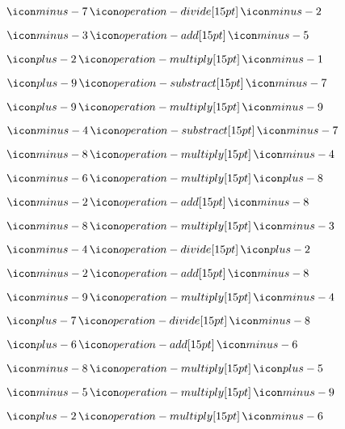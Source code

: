 {{\item$\mseven \obelus \mtwo$

\item$\mthree \plus \mfive$

\item$\two \time \mone$

\item$\nine \minus \mseven$

\item$\nine \time \mnine$

\item$\mfour \minus \mseven$

\item$\meight \time \mfour$

\item$\msix \time \eight$

\item$\mtwo \plus \meight$

\item$\meight \time \mthree$

\item$\mfour \obelus \two$

\item$\mtwo \plus \meight$

\item$\mnine \time \mfour$

\item$\seven \obelus \meight$

\item$\six \plus \msix$

\item$\meight \time \five$

\item$\mfive \time \mnine$

\item$\two \time \msix$

}}

\newpage

